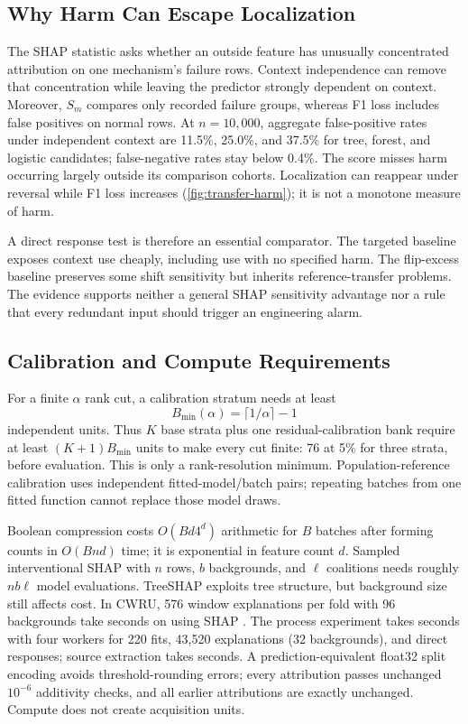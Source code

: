 \documentclass[conference]{IEEEtran}
\begin{document}
\subsection{Why Harm Can Escape Localization}
The SHAP statistic asks whether an outside feature has unusually concentrated attribution on one mechanism's failure rows. Context independence can remove that concentration while leaving the predictor strongly dependent on context. Moreover, $S_m$ compares only recorded failure groups, whereas F1 loss includes false positives on normal rows. At $n=10{,}000$, aggregate false-positive rates under independent context are 11.5\%, 25.0\%, and 37.5\% for tree, forest, and logistic candidates; false-negative rates stay below 0.4\%. The score misses harm occurring largely outside its comparison cohorts. Localization can reappear under reversal while F1 loss increases (\cref{fig:transfer-harm}); it is not a monotone measure of harm.

A direct response test is therefore an essential comparator. The targeted baseline exposes context use cheaply, including use with no specified harm. The flip-excess baseline preserves some shift sensitivity but inherits reference-transfer problems. The evidence supports neither a general SHAP sensitivity advantage nor a rule that every redundant input should trigger an engineering alarm.

\subsection{Calibration and Compute Requirements}
For a finite $\alpha$ rank cut, a calibration stratum needs at least
\begin{equation}
 B_{\min}(\alpha)=\lceil1/\alpha\rceil-1
\end{equation}
independent units. Thus $K$ base strata plus one residual-calibration bank require at least $(K+1)B_{\min}$ units to make every cut finite: 76 at 5\% for three strata, before evaluation. This is only a rank-resolution minimum. Population-reference calibration uses independent fitted-model/batch pairs; repeating batches from one fitted function cannot replace those model draws.

Boolean compression costs $O(Bd4^d)$ arithmetic for $B$ batches after forming counts in $O(Bnd)$ time; it is exponential in feature count $d$. Sampled interventional SHAP with $n$ rows, $b$ backgrounds, and $\ell$ coalitions needs roughly $nb\ell$ model evaluations. TreeSHAP exploits tree structure, but background size still affects cost. In CWRU, 576 window explanations per fold with 96 backgrounds take \cwruShapRuntime{} seconds on \cwruHardware{} using SHAP \cwruShapVersion{}. The process experiment takes \dtuModelRuntime{} seconds with four workers for 220 fits, 43,520 explanations (32 backgrounds), and direct responses; source extraction takes \dtuSourceRuntime{} seconds. A prediction-equivalent float32 split encoding avoids threshold-rounding errors; every attribution passes unchanged $10^{-6}$ additivity checks, and all earlier attributions are exactly unchanged. Compute does not create acquisition units.
\end{document}
